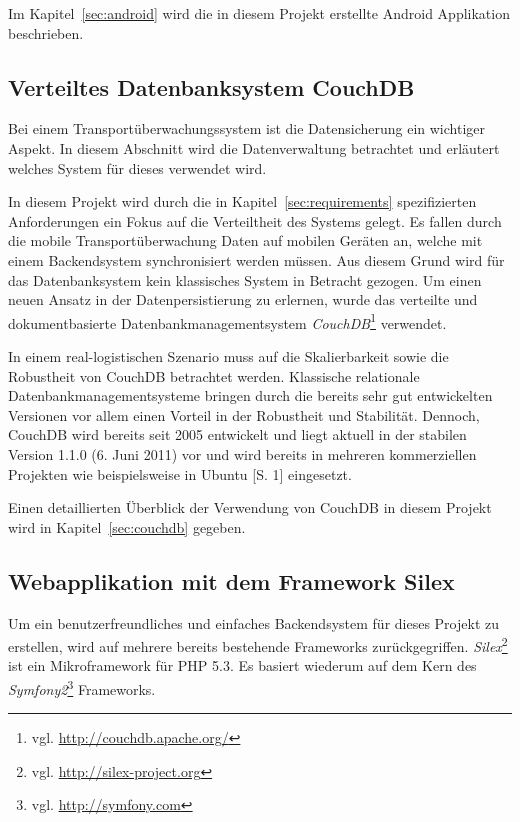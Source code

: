 Im Kapitel~\ref{sec:android} wird die in diesem Projekt erstellte Android Applikation
	beschrieben.

\subsection{Verteiltes Datenbanksystem CouchDB}
\label{subsec:couchdb}

Bei einem Transportüberwachungssystem ist die Datensicherung ein
	wichtiger Aspekt. In diesem Abschnitt wird die Datenverwaltung
	betrachtet und erläutert welches System für dieses
	verwendet wird.

In diesem Projekt wird durch die in Kapitel~\ref{sec:requirements} spezifizierten
	Anforderungen ein Fokus auf die Verteiltheit des Systems gelegt. Es fallen
	durch die mobile Transportüberwachung Daten auf mobilen Geräten an, welche
	mit einem Backendsystem synchronisiert werden müssen. Aus diesem Grund wird
	für das Datenbanksystem kein klassisches System in Betracht gezogen. Um einen
	neuen Ansatz in der Datenpersistierung zu erlernen, wurde das verteilte
	und dokumentbasierte Datenbankmanagementsystem \emph{CouchDB}\footnote{vgl.
	\url{http://couchdb.apache.org/}} verwendet.

In einem real-logistischen Szenario muss auf die Skalierbarkeit sowie die
	Robustheit von CouchDB betrachtet werden. Klassische relationale
	Datenbankmanagementsysteme bringen durch die bereits sehr gut entwickelten
	Versionen vor allem einen Vorteil in der Robustheit und Stabilität. Dennoch,
	CouchDB wird bereits seit 2005 entwickelt und liegt aktuell in der stabilen
	Version 1.1.0 (6. Juni 2011) vor und wird bereits in mehreren kommerziellen
	Projekten wie beispielsweise in Ubuntu \cite{Murphy09}[S. 1] eingesetzt.

Einen detaillierten Überblick der Verwendung von CouchDB in diesem Projekt
	wird in Kapitel~\ref{sec:couchdb} gegeben.

\subsection{Webapplikation mit dem Framework Silex}
\label{subsec:webapplication}

Um ein benutzerfreundliches und einfaches Backendsystem
	für dieses Projekt zu erstellen, wird auf mehrere bereits bestehende Frameworks
	zurückgegriffen. \emph{Silex}\footnote{vgl. \url{http://silex-project.org}} ist
	ein	Mikroframework für PHP 5.3. Es basiert wiederum auf dem Kern des
	\emph{Symfony2}\footnote{vgl. \url{http://symfony.com}} Frameworks.
	
